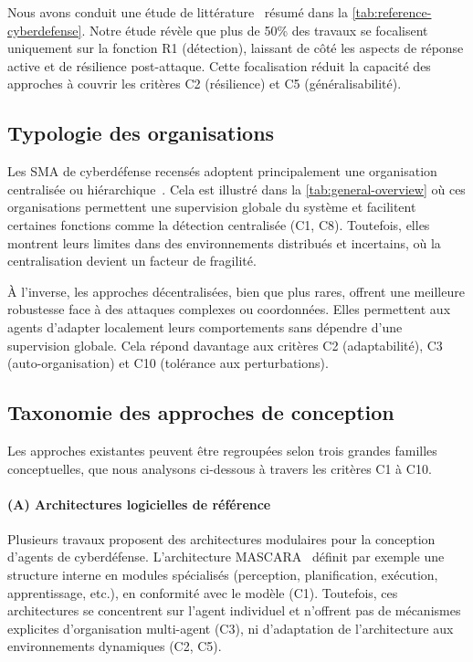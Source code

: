 Nous avons conduit une étude de littérature~\cite{soule2023rjciathese} résumé dans la \autoref{tab:reference-cyberdefense}. Notre étude révèle que plus de 50\% des travaux se focalisent uniquement sur la fonction R1 (détection), laissant de côté les aspects de réponse active et de résilience post-attaque. Cette focalisation réduit la capacité des approches à couvrir les critères C2 (résilience) et C5 (généralisabilité).



\subsection*{Typologie des organisations}

Les \ac{SMA} de cyberdéfense recensés adoptent principalement une organisation centralisée ou hiérarchique~\cite{soule2023ressithese}. Cela est illustré dans la \autoref{tab:general-overview} où ces organisations permettent une supervision globale du système et facilitent certaines fonctions comme la détection centralisée (C1, C8). Toutefois, elles montrent leurs limites dans des environnements distribués et incertains, où la centralisation devient un facteur de fragilité.

À l'inverse, les approches décentralisées, bien que plus rares, offrent une meilleure robustesse face à des attaques complexes ou coordonnées. Elles permettent aux agents d'adapter localement leurs comportements sans dépendre d'une supervision globale. Cela répond davantage aux critères C2 (adaptabilité), C3 (auto-organisation) et C10 (tolérance aux perturbations).



\subsection*{Taxonomie des approches de conception}

Les approches existantes peuvent être regroupées selon trois grandes familles conceptuelles, que nous analysons ci-dessous à travers les critères C1 à C10.

\paragraph{(A) Architectures logicielles de référence}

Plusieurs travaux proposent des architectures modulaires pour la conception d'agents de cyberdéfense. L'architecture \ac{MASCARA}~\cite{Kott2023} définit par exemple une structure interne en modules spécialisés (perception, planification, exécution, apprentissage, etc.), en conformité avec le modèle  (C1). Toutefois, ces architectures se concentrent sur l'agent individuel et n'offrent pas de mécanismes explicites d'organisation multi-agent (C3), ni d'adaptation de l'architecture aux environnements dynamiques (C2, C5).

